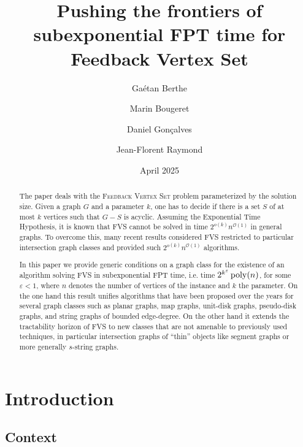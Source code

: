 \documentclass{amsart}
\title{
Pushing the frontiers of subexponential FPT time for Feedback Vertex Set}
\author[G.~Berthe]{Gaétan Berthe}
\author[M.~Bougeret]{Marin Bougeret}
\author[D.~Gonçalves]{Daniel Gonçalves}
\author[J.-F.~Raymond]{Jean-Florent Raymond}
\date{April 2025}
\newcommand{\eps}{\varepsilon}
\newcommand{\fvs}{\textsc{Feedback Vertex Set}\xspace}
\newcommand{\FVS}{\textsc{FVS}\xspace}
\renewcommand{\O}{\mathcal{O}}
\begin{document}
\begin{abstract}
The paper deals with the \fvs problem parameterized by the solution size. Given a graph $G$ and a parameter $k$, one has to decide if there is a set $S$ of at most $k$ vertices such that $G-S$ is acyclic.
Assuming the Exponential Time Hypothesis, it is known that \FVS cannot be solved in time $2^{o(k)}n^{\O(1)}$ in general graphs. To overcome this, many recent results considered \FVS restricted to particular intersection graph classes and provided such $2^{o(k)}n^{\O(1)}$ algorithms. 


In this paper we provide generic conditions on a graph class for the existence of an algorithm solving \FVS in subexponential FPT time, i.e. time $2^{k^\eps} \mathop{\rm poly}(n)$, for some $\eps<1$, where $n$ denotes the number of vertices of the instance and $k$ the parameter.
On the one hand this result unifies algorithms that have been proposed over the years for several graph classes such as planar graphs, map graphs, unit-disk graphs, pseudo-disk graphs, and string graphs of bounded edge-degree. On the other hand it extends the tractability horizon of \FVS to new classes that are not amenable to previously used techniques, in particular intersection graphs of ``thin'' objects like segment graphs or more generally $s$-string graphs.
\end{abstract} 
\maketitle


\section{Introduction}
\label{sec:intro}

\subsection{Context}
\end{document}
